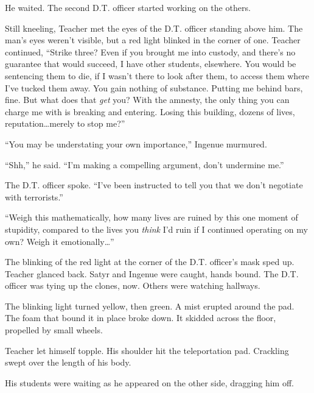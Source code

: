 He waited.  The second D.T. officer started working on the others.



Still kneeling, Teacher met the eyes of the D.T. officer standing above him.  The man's eyes weren't visible, but a red light blinked in the corner of one.  Teacher continued, ``Strike three?  Even if you brought me into custody, and there's no guarantee that would succeed, I have other students, elsewhere.  You would be sentencing them to die, if I wasn't there to look after them, to access them where I've tucked them away.  You gain nothing of substance.  Putting me behind bars, fine.  But what does that \emph{get} you?  With the amnesty, the only thing you can charge me with is breaking and entering.  Losing this building, dozens of lives, reputation\ldots merely to stop me?''



``You may be understating your own importance,'' Ingenue murmured.



``Shh,'' he said.  ``I'm making a compelling argument, don't undermine me.''



The D.T. officer spoke.  ``I've been instructed to tell you that we don't negotiate with terrorists.''



``Weigh this mathematically, how many lives are ruined by this one moment of stupidity, compared to the lives you \emph{think} I'd ruin if I continued operating on my own?  Weigh it emotionally\ldots''



The blinking of the red light at the corner of the D.T. officer's mask sped up. Teacher glanced back.  Satyr and Ingenue were caught, hands bound.  The D.T. officer was tying up the clones, now.  Others were watching hallways.



The blinking light turned yellow, then green.  A mist erupted around the pad.  The foam that bound it in place broke down.  It skidded across the floor, propelled by small wheels.



Teacher let himself topple.  His shoulder hit the teleportation pad.  Crackling swept over the length of his body.



His students were waiting as he appeared on the other side, dragging him off.



